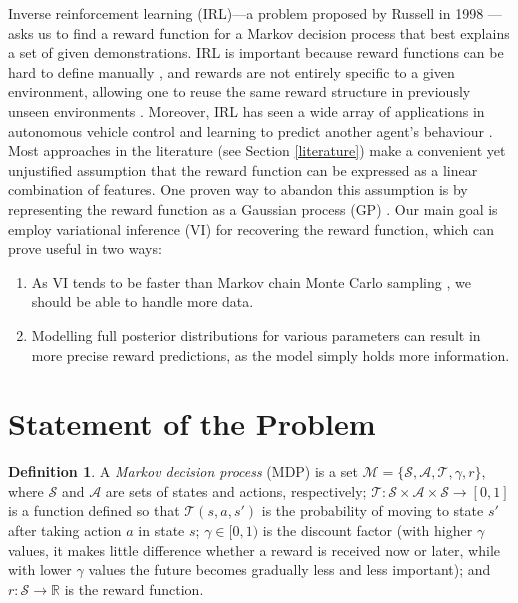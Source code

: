 \documentclass{mprop}
\theoremstyle{definition}
\newtheorem{definition}{Definition}
\begin{document}
Inverse reinforcement learning (IRL)---a problem proposed by Russell in
1998 \cite{DBLP:conf/colt/Russell98}---asks us to find a reward function for a
Markov decision process that best explains a set of given demonstrations. IRL is
important because reward functions can be hard to define manually
\cite{DBLP:conf/icml/PieterN04,DBLP:journals/corr/abs-1806-06877}, and rewards
are not entirely specific to a given environment, allowing one to reuse the same
reward structure in previously unseen environments
\cite{DBLP:journals/corr/abs-1806-06877,DBLP:conf/uai/JinDAS17,DBLP:conf/nips/LevinePK11}.
Moreover, IRL has seen a wide array of applications in autonomous vehicle
control \cite{DBLP:journals/ijsr/KimP16,DBLP:journals/ijrr/KretzschmarSSB16} and
learning to predict another agent's behaviour
\cite{DBLP:journals/ai/BogertD18,DBLP:conf/aaai/VogelRGR12,ziebart2008maximum,DBLP:conf/huc/ZiebartMDB08,DBLP:conf/iros/ZiebartRGMPBHDS09}.
Most approaches in the literature (see Section \ref{literature}) make a
convenient yet unjustified assumption that the reward function can be expressed
as a linear combination of features. One proven way to abandon this assumption
is by representing the reward function as a Gaussian process (GP)
\cite{DBLP:conf/uai/JinDAS17,DBLP:conf/nips/LevinePK11,DBLP:journals/corr/abs-1208-2112}.
Our main goal is employ variational inference (VI) for recovering the reward
function, which can prove useful in two ways:
\begin{enumerate}
\item As VI tends to be faster than Markov chain Monte Carlo
  sampling \cite{blei2017variational}, we should be able to handle more data.
\item Modelling full posterior distributions for various parameters can result
  in more precise reward predictions, as the model simply holds more
  information.
\end{enumerate}

\section{Statement of the Problem}

\begin{definition}
  A \emph{Markov decision process} (MDP) is a set $\mathcal{M} = \{ \mathcal{S},
  \mathcal{A}, \mathcal{T}, \gamma, r \}$, where $\mathcal{S}$ and
  $\mathcal{A}$ are sets of states and actions, respectively; $\mathcal{T} :
  \mathcal{S} \times \mathcal{A} \times \mathcal{S} \to [0, 1]$ is a function
  defined so that $\mathcal{T}(s, a, s')$ is the probability of moving to state $s'$
  after taking action $a$ in state $s$; $\gamma \in [0, 1)$ is the discount
  factor (with higher $\gamma$ values, it makes little difference whether a
  reward is received now or later, while with lower $\gamma$ values the future
  becomes gradually less and less important); and $r : \mathcal{S} \to
  \mathbb{R}$ is the reward function.
\end{definition}
\end{document}
